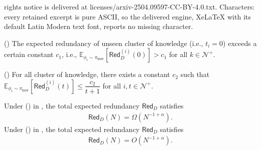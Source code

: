 \documentclass[10pt,a4paper]{amsart}
\newcommand{\basemeasure}{\pi_{\text{knw}}}
\newcommand{\dataerror}{\mathsf{Red}_D}
\newcommand{\testdataerror}{\mathsf{Red}_D}
\begin{document}
rights notice is delivered at licenses/arxiv-2504.09597-CC-BY-4.0.txt. Characters: every retained excerpt is pure ASCII, so the delivered engine, XeLaTeX with its default Latin Modern text font, reports no missing character.
\begin{assumption}
\label{ass:data law}
(\uppercase\expandafter{})
The expected redundancy of unseen cluster of knowledge (i.e., $t_i=0$) exceeds a certain constant $c_1$, i.e., $\mathbb{E}_{\phi_i\sim \basemeasure}\left[\dataerror^{(i)}(0)\right]>c_1$ for all $k\in \mathcal{N}^+$.

(\uppercase\expandafter{})
For all cluster of knowledge, there exists a constant $c_2$ such that 
 $\mathbb{E}_{\phi_i\sim \basemeasure}\left[\dataerror^{(i)}(t)\right]\le \dfrac{c_2}{t+1}$ for all $i,t\in \mathcal{N}^+$.
\end{assumption}

\begin{theorem}
\label{thm: data scaling lower bound}
Under (\uppercase\expandafter{}) in , the total expected redundancy $\testdataerror$ satisfies
    \begin{align*}
    \testdataerror(N) = \Omega(N^{-1+\alpha}).
\end{align*}
Under (\uppercase\expandafter{}) in , the total expected redundancy $\testdataerror$ satisfies
    \begin{align*}
    \testdataerror(N) = O(N^{-1+\alpha}).
\end{align*}
\end{theorem}
\end{document}
